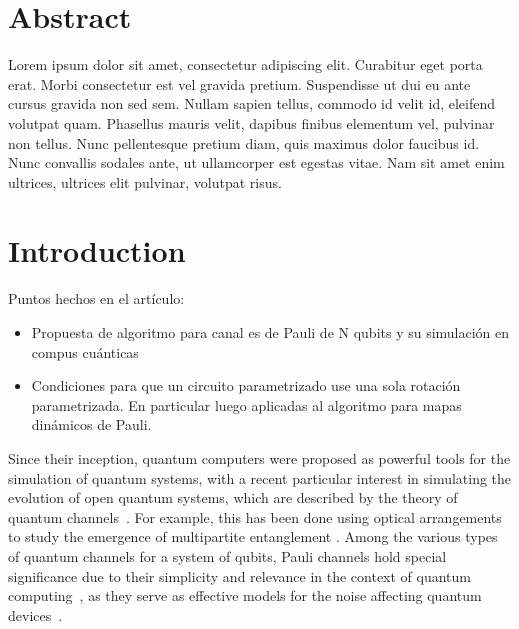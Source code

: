\documentclass[10pt,letterpaper]{article} %
\begin{document}
\section*{Abstract}
Lorem ipsum dolor sit amet, consectetur adipiscing elit. Curabitur eget porta erat. Morbi consectetur est vel gravida pretium. Suspendisse ut dui eu ante cursus gravida non sed sem. Nullam sapien tellus, commodo id velit id, eleifend volutpat quam. Phasellus mauris velit, dapibus finibus elementum vel, pulvinar non tellus. Nunc pellentesque pretium diam, quis maximus dolor faucibus id. Nunc convallis sodales ante, ut ullamcorper est egestas vitae. Nam sit amet enim ultrices, ultrices elit pulvinar, volutpat risus.



\linenumbers

\section{Introduction} %


Puntos hechos en el artículo:
\begin{itemize}
\item Propuesta de algoritmo para canal es de Pauli de N qubits y su simulación en compus cuánticas
\item Condiciones para que un circuito parametrizado use una sola rotación parametrizada. En particular luego aplicadas al algoritmo para mapas dinámicos de Pauli.
\end{itemize}


Since their inception, quantum computers were proposed as powerful tools for the simulation of quantum systems,
with a recent particular interest in simulating the evolution of open quantum systems, 
which are described by the theory of quantum channels~\cite{cleve,Zanetti,Xin,Wei}. 
{\color{purple} For example, this has been done using optical arrangements
to study the emergence of multipartite entanglement \cite{Andrea,Andrea_AD}.}
Among the various types of quantum channels for a system of qubits, 
Pauli channels hold special significance due to their simplicity 
and relevance in the context of quantum computing~\cite{Zbigniew,geometry}, 
as they serve as effective models for the noise affecting quantum devices~\cite{Flammia,Fawzi}.
\end{document}
